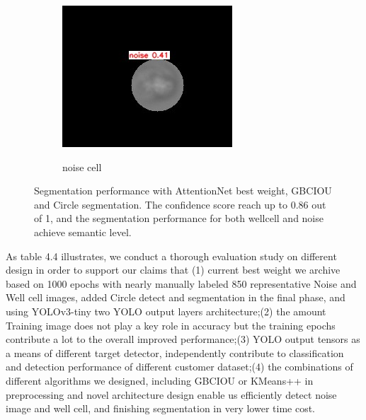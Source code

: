 \begin{figure}[t]
\begin{center}
		\begin{subfigure}[b]{0.25\textwidth}
			\includegraphics[width=\textwidth]{thesis-template-master/images/bestweightonnoise3.jpg}
			\label{fig:Good Cell}
			\caption{noise cell}
		\end{subfigure}
	\end{center}
	\caption{ Segmentation performance with AttentionNet best weight, GBCIOU and Circle segmentation. The confidence score reach up to 0.86 out of 1, and the segmentation performance for both wellcell and noise achieve semantic level.}
	\label{fig:lennas}
\end{figure}

As table 4.4 illustrates, we conduct a thorough evaluation study on different design in order to support our claims that (1) current best weight we archive based on 1000 epochs with nearly manually labeled 850 representative Noise and Well cell images, added Circle detect and segmentation in the final phase, and using YOLOv3-tiny two YOLO output layers architecture;(2) the amount Training image does not play a key role in accuracy but the training epochs contribute a lot to the overall improved performance;(3) YOLO output tensors as a means of different target detector, independently contribute to classification and detection performance of  different customer dataset;(4) the combinations of different algorithms we designed, including GBCIOU or KMeans++ in preprocessing and novel architecture design enable us efficiently detect noise image and well cell, and finishing segmentation in very lower time cost.


